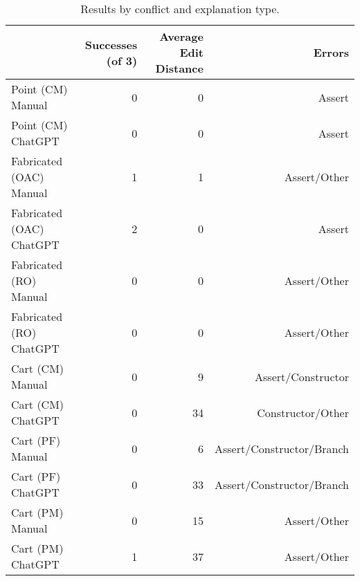 \begin{table}[t]
    \centering
    \begin{tabular}{@{\extracolsep{\fill}} lrrr} \toprule
                             & Successes (of 3) & Average Edit Distance & Errors \\
    \midrule
    Point (CM) Manual        & 0 & 0 & Assert \\
    Point (CM) ChatGPT       & 0 & 0 & Assert \\
    Fabricated (OAC) Manual  & 1 & 1 & Assert/Other \\
    Fabricated (OAC) ChatGPT & 2 & 0 & Assert \\
    Fabricated (RO) Manual   & 0 & 0 & Assert/Other \\
    Fabricated (RO) ChatGPT  & 0 & 0 & Assert/Other \\
    Cart (CM) Manual         & 0 & 9 & Assert/Constructor \\
    Cart (CM) ChatGPT        & 0 & 34 & Constructor/Other \\
    Cart (PF) Manual         & 0 & 6 & Assert/Constructor/Branch \\
    Cart (PF) ChatGPT        & 0 & 33 & Assert/Constructor/Branch \\
    Cart (PM) Manual         & 0 & 15 & Assert/Other \\
    Cart (PM) ChatGPT        & 1 & 37 & Assert/Other \\
    \midrule
    \end{tabular}
    \caption{Results by conflict and explanation type.\label{tab:results:rq2}}
\end{table}

